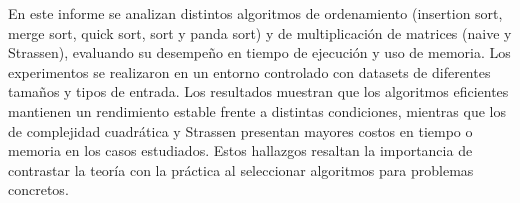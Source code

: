 En este informe se analizan distintos algoritmos de ordenamiento (insertion sort, merge sort, quick sort, sort y panda sort) y de multiplicación de matrices (naive y Strassen), evaluando su desempeño en tiempo de ejecución y uso de memoria. Los experimentos se realizaron en un entorno controlado con datasets de diferentes tamaños y tipos de entrada. Los resultados muestran que los algoritmos eficientes mantienen un rendimiento estable frente a distintas condiciones, mientras que los de complejidad cuadrática y Strassen presentan mayores costos en tiempo o memoria en los casos estudiados. Estos hallazgos resaltan la importancia de contrastar la teoría con la práctica al seleccionar algoritmos para problemas concretos.